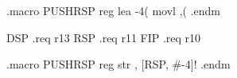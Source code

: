 .macro PUSHRSP reg
lea -4(%
movl \reg,(%
.endm
 
DSP     .req    r13
RSP     .req    r11
FIP     .req    r10

.macro PUSHRSP reg
str     \reg, [RSP, #-4]!
.endm


